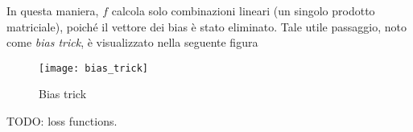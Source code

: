 In questa maniera, $f$ calcola solo combinazioni lineari (un singolo prodotto matriciale), poiché il vettore dei bias è stato eliminato.
Tale utile passaggio, noto come \textit{bias trick}, è visualizzato nella seguente figura

\begin{figure}[h]
\centering
\texttt{[image: bias\_trick]}
\caption{Bias trick}
\label{bias_trick}
\end{figure}

TODO: loss functions.